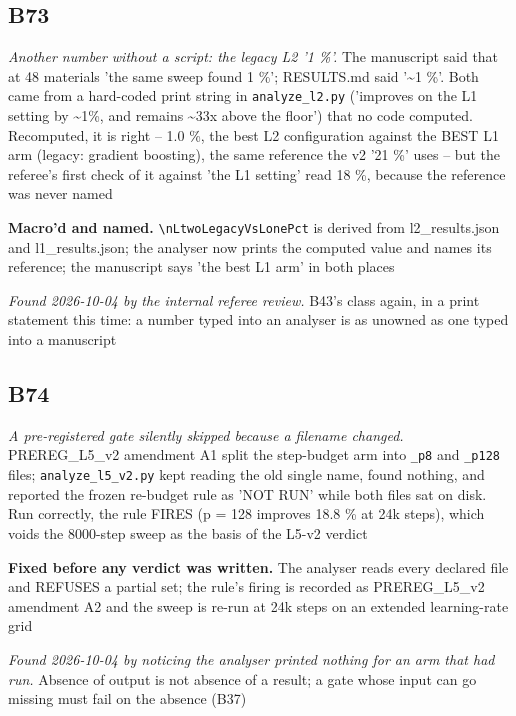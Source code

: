 \documentclass[10pt]{article}
\begin{document}
\subsection*{B73}\label{led:B73}
\begin{description}[leftmargin=0pt,itemsep=1pt]
\item[Defect.] \emph{Another number without a script: the legacy L2 '1 \%'.} The manuscript said that at 48 materials 'the same sweep found 1 \%'; RESULTS.md said '\textasciitilde{}1 \%'. Both came from a hard-coded print string in \texttt{analyze\_l2.py} ('improves on the L1 setting by \textasciitilde{}1\%, and remains \textasciitilde{}33x above the floor') that no code computed. Recomputed, it is right -- 1.0 \%, the best L2 configuration against the BEST L1 arm (legacy: gradient boosting), the same reference the v2 '21 \%' uses -- but the referee's first check of it against 'the L1 setting' read 18 \%, because the reference was never named
\item[Resolution.] \textbf{Macro'd and named.} \texttt{\textbackslash{}nLtwoLegacyVsLonePct} is derived from l2\_results.json and l1\_results.json; the analyser now prints the computed value and names its reference; the manuscript says 'the best L1 arm' in both places
\item[Note.] \emph{Found 2026-10-04 by the internal referee review.} B43's class again, in a print statement this time: a number typed into an analyser is as unowned as one typed into a manuscript
\end{description}
\subsection*{B74}\label{led:B74}
\begin{description}[leftmargin=0pt,itemsep=1pt]
\item[Defect.] \emph{A pre-registered gate silently skipped because a filename changed.} PREREG\_L5\_v2 amendment A1 split the step-budget arm into \texttt{\_p8} and \texttt{\_p128} files; \texttt{analyze\_l5\_v2.py} kept reading the old single name, found nothing, and reported the frozen re-budget rule as 'NOT RUN' while both files sat on disk. Run correctly, the rule FIRES (p = 128 improves 18.8 \% at 24k steps), which voids the 8000-step sweep as the basis of the L5-v2 verdict
\item[Resolution.] \textbf{Fixed before any verdict was written.} The analyser reads every declared file and REFUSES a partial set; the rule's firing is recorded as PREREG\_L5\_v2 amendment A2 and the sweep is re-run at 24k steps on an extended learning-rate grid
\item[Note.] \emph{Found 2026-10-04 by noticing the analyser printed nothing for an arm that had run.} Absence of output is not absence of a result; a gate whose input can go missing must fail on the absence (B37)
\end{description}
\end{document}

